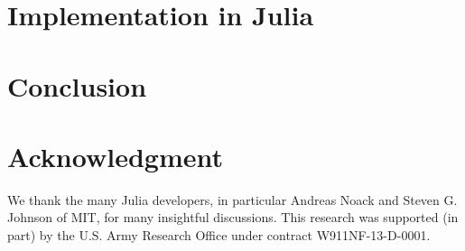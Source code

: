 \documentclass[conference]{IEEEtran}
\begin{document}
\label{sec:julia}
\section{Implementation in Julia}

\label{sec:conclusion}
\section{Conclusion}

\label{sec:acknowledgement}
\section*{Acknowledgment}

We thank the many Julia developers, in particular Andreas Noack and Steven G.
Johnson of MIT, for many insightful discussions.
This research was supported (in part) by the U.S. Army Research Office under
contract W911NF-13-D-0001.




\end{document}
